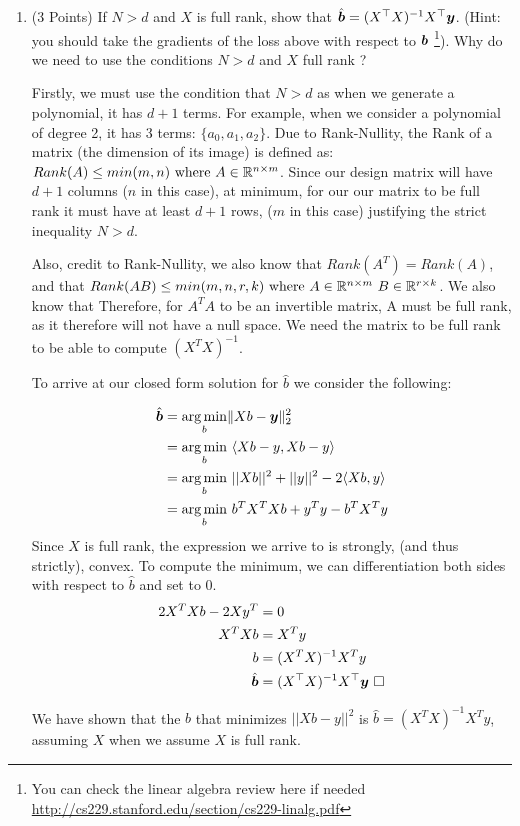 \documentclass{article}
\newcommand{\bb}{b}
\begin{document}
\begin{enumerate}
    \item (3 Points) If $N > d$ and $X$ is full rank, show that $\hat{\bs \bb} = (X^\top X)^{-1}X^\top \bs y$. (Hint: you should take the gradients of the loss above with respect to $\bs \bb$ \footnote{You can check the linear algebra review here if needed \url{http://cs229.stanford.edu/section/cs229-linalg.pdf}}). Why do we need to use the conditions $N > d$ and $X$ full rank ? 
    
    Firstly, we must use the condition that $N > d$ as when we generate a polynomial, it has $d+1$ terms. For example, when we consider a polynomial of degree 2, it has 3 terms: $\{a_0, a_1, a_2\}$. Due to Rank-Nullity, the Rank of a matrix (the dimension of its image) is defined as: $Rank(A) \leq min(m,n) \text{ where } A \in \mathbb{R}^{n\times m}$. Since our design matrix will have $d+1$ columns ($n$ in this case), at minimum, for our our matrix to be full rank it must have at least $d+1$ rows, ($m$ in this case) justifying the strict inequality $N >d$.
    
    Also, credit to Rank-Nullity, we also know that $Rank(A^T) = Rank(A)$, and that $Rank(AB) \leq min(m,n,r,k) \text{ where } A \in \mathbb{R}^{n\times m} \ B \in \mathbb{R}^{r \times k}$. We also know that Therefore, for $A^TA$ to be an invertible matrix, A must be full rank, as it therefore will not have a null space. We need the matrix to be full rank to be able to compute $(X^TX)^{-1}$.
    
    To arrive at our closed form solution for $\hat{b}$ we consider the following:
    
    \begin{equation}
        \begin{split}
            \hat{\bs \bb} &= \underset{\bb}{\arg\min}\lVert X\bb - \bs y \Vert_2^2\\
            &= \underset{\bb}{\arg\min} \ \langle Xb-y, Xb-y\rangle \\
            &= \underset{\bb}{\arg\min} \ ||Xb||^2 + ||y||^2 - 2\langle Xb, y\rangle \\
            &= \underset{\bb}{\arg\min} \ b^TX^TXb + y^Ty - b^TX^Ty 
          \end{split}
    \end{equation}
Since $X$ is full rank, the expression we arrive to is strongly, (and thus strictly), convex. To compute the minimum, we can differentiation both sides with respect to $\hat{b}$ and set to 0.
\begin{equation}
    \begin{split}
        2X^TXb - 2Xy^T &= 0 \\
        X^TXb &= X^Ty \\
        b &= (X^TX)^{-1}X^Ty \\
        \hat{\bs \bb} &= (X^\top X)^{-1}X^\top \bs y \ \square
    \end{split}
\end{equation}

We have shown that the $b$ that minimizes $||Xb-y||^2$ is $\hat{b}=(X^TX)^{-1}X^Ty$, assuming $X$ when we assume $X$ is full rank.
    
\setcounter{saveenum}{\value{enumi}}  
\end{enumerate}
\end{document}
